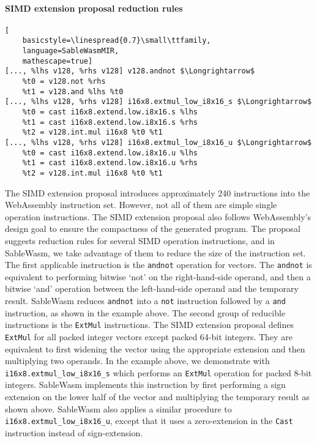 \paragraph{SIMD extension proposal reduction rules} \quad
\begin{lstlisting}[
    basicstyle=\linespread{0.7}\small\ttfamily, 
    language=SableWasmMIR, 
    mathescape=true]
[..., %lhs v128, %rhs v128] v128.andnot $\Longrightarrow$
    %t0 = v128.not %rhs 
    %t1 = v128.and %lhs %t0
[..., %lhs v128, %rhs v128] i16x8.extmul_low_i8x16_s $\Longrightarrow$
    %t0 = cast i16x8.extend.low.i8x16.s %lhs
    %t1 = cast i16x8.extend.low.i8x16.s %rhs
    %t2 = v128.int.mul i16x8 %t0 %t1
[..., %lhs v128, %rhs v128] i16x8.extmul_low_i8x16_u $\Longrightarrow$
    %t0 = cast i16x8.extend.low.i8x16.u %lhs
    %t1 = cast i16x8.extend.low.i8x16.u %rhs
    %t2 = v128.int.mul i16x8 %t0 %t1
\end{lstlisting}
The SIMD extension proposal introduces approximately 240 instructions into the
WebAssembly instruction set. However, not all of them are simple single
operation instructions. The SIMD extension proposal also follows WebAssembly's
design goal to ensure the compactness of the generated program. The proposal
suggests reduction rules for several SIMD operation instructions, and in
SableWasm, we take advantage of them to reduce the size of the instruction set.
The first applicable instruction is the \texttt{andnot} operation for vectors.
The \texttt{andnot} is equivalent to performing bitwise `not' on the
right-hand-side operand, and then a bitwise `and' operation between the
left-hand-side operand and the temporary result. SableWasm reduces
\texttt{andnot} into a \texttt{not} instruction followed by a \texttt{and}
instruction, as shown in the example above. The second group of reducible
instructions is the \texttt{ExtMul} instructions. The SIMD extension proposal
defines \texttt{ExtMul} for all packed integer vectors except packed 64-bit
integers. They are equivalent to first widening the vector using the appropriate
extension and then multiplying two operands. In the example above, we
demonstrate with \texttt{i16x8.extmul\_low\_i8x16\_s} which performs an
\texttt{ExtMul} operation for packed 8-bit integers. SableWasm implements this
instruction by first performing a sign extension on the lower half of the vector
and multiplying the temporary result as shown above. SableWasm also applies a
similar procedure to \texttt{i16x8.extmul\_low\_i8x16\_u}, except that it uses
a zero-extension in the \texttt{Cast} instruction instead of sign-extension.

